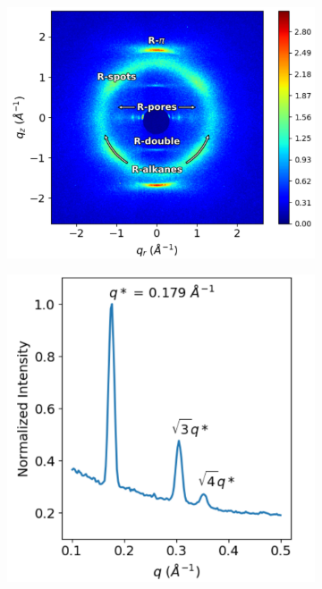 \documentclass[journal=jpcbfk,manuscript=article]{achemso}
\begin{document}
  \begin{figure}[!htb]
        \centering
                \begin{subfigure}[t]{0.495\linewidth}
                \centering
                \includegraphics[width=\linewidth]{WAXS_annotated_words.pdf} 
                \caption{}\label{fig:WAXS}
        \end{subfigure}
	\begin{subfigure}[t]{0.405\linewidth}
                \centering
                \includegraphics[width=\textwidth]{SAXS.pdf}

\end{subfigure}
\end{figure}
\end{document}
